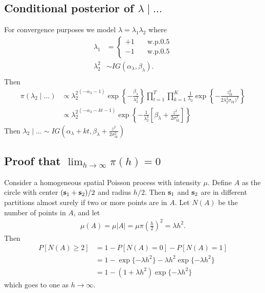 \documentclass[11pt]{article}
\begin{document}
\subsection*{Conditional posterior of $\lambda \mid \ldots$}\label{s:lambdapost}
For convergence purposes we model $\lambda = \lambda_1 \lambda_2$ where
\begin{align}
  \lambda_1 &= \left\{ \begin{array}{ll}
      +1 \quad & \text{w.p.} 0.5\\
      -1 \quad & \text{w.p.} 0.5
   \end{array}\right.\\
   \lambda^2_2 & \sim IG(\alpha_\lambda, \beta_\lambda).\\
\end{align}
Then
\begin{align*}
  \pi(\lambda_2 \mid \ldots) &\propto {\lambda_2^2}^{(-\alpha_\lambda - 1)} \exp\left\{ - \frac{ \beta_\lambda }{ \lambda_2^2} \right\} \prod_{t = 1}^{T} \prod_{k = 1}^K \frac{1} {\lambda_2} \exp\left\{ - \frac{ z^2_{tk} }{ 2 \lambda_2^2  \sigma_{tk})^2} \right\} \\
   & \propto {\lambda_2^2}^{(-\alpha_\lambda - kt - 1)} \exp \left\{ -\frac{1}{\lambda^2_2} \left[ \beta_\lambda + \frac{ z^2 }{2 \sigma^2_{tk}} \right] \right\}
\end{align*}
Then $\lambda_2 \mid \ldots \sim IG \left(\alpha_\lambda + kt, \beta_\lambda + \frac{ z^2 }{2 \sigma^2_{tk}} \right)$

\subsection{Proof that $\lim_{h \rightarrow \infty} \pi(h) = 0$} \label{a:proofsamepartition}
Consider a homogeneous spatial Poisson process with intensity $\mu$.
Define $A$ as the circle with center \hbox{$(\mbox{\bf s}_1 + \mbox{\bf s}_2) / 2$} and radius $h / 2$.
Then $\mbox{\bf s}_1$ and $\mbox{\bf s}_2$ are in different partitions almost surely if two or more points are in $A$.
Let $N(A)$ be the number of points in $A$, and let
\begin{align*}
  \mu(A) = \mu |A| = \mu \pi \left(\frac{h}{2}\right)^2 = \lambda h^2.
\end{align*}
Then
\begin{align*}
  P[N(A) \ge 2] &= 1 - P[N(A) = 0] - P[N(A) = 1]\\
                &= 1 - \exp\{-\lambda h^2\} - \lambda h^2 \exp\{-\lambda h^2\} \\
                &= 1 - (1 + \lambda h^2) \exp\{-\lambda h^2\}
\end{align*}
which goes to one as $h \rightarrow \infty$.
\end{document}
